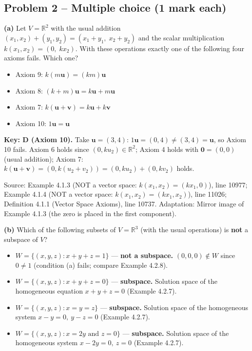 \documentclass[11pt,a4paper]{article}
\newcommand{\Src}[1]{{\footnotesize\color{black!65}Source: #1}}
\begin{document}
\subsection*{Problem 2 -- Multiple choice (1 mark each)}
\textbf{(a)} Let $V=\mathbb{R}^2$ with the usual addition $(x_1,x_2)+(y_1,y_2)=(x_1+y_1,\;x_2+y_2)$ and the scalar multiplication $k(x_1,x_2)=(0,\;kx_2)$. With these operations exactly one of the following four axioms fails. Which one?\par
\begin{itemize}[leftmargin=8mm,itemsep=0pt]\item[A] Axiom 9: $k(m\mathbf{u})=(km)\mathbf{u}$\item[B] Axiom 8: $(k+m)\mathbf{u}=k\mathbf{u}+m\mathbf{u}$\item[C] Axiom 7: $k(\mathbf{u}+\mathbf{v})=k\mathbf{u}+k\mathbf{v}$\item[D$^{\ast}$] Axiom 10: $1\mathbf{u}=\mathbf{u}$\end{itemize}
\textbf{Key: D (Axiom 10).} Take $\mathbf{u}=(3,4)$: $1\mathbf{u}=(0,4)\neq(3,4)=\mathbf{u}$, so Axiom 10 fails. Axiom 6 holds since $(0,ku_2)\in\mathbb{R}^2$; Axiom 4 holds with $\mathbf{0}=(0,0)$ (usual addition); Axiom 7: $k(\mathbf{u}+\mathbf{v})=(0,k(u_2+v_2))=(0,ku_2)+(0,kv_2)$ holds.\par
\Src{Example 4.1.3 (NOT a vector space: $k(x_1,x_2)=(kx_1,0)$), line 10977; Example 4.1.4 (NOT a vector space: $k(x_1,x_2)=(kx_1,x_2)$), line 11026; Definition 4.1.1 (Vector Space Axioms), line 10737. Adaptation: Mirror image of Example 4.1.3 (the zero is placed in the first component).}\par
{}\textbf{(b)} Which of the following subsets of $V=\mathbb{R}^3$ (with the usual operations) is \textbf{not} a subspace of $V$?\par
\begin{itemize}[leftmargin=8mm,itemsep=0pt]\item[A$^{\ast}$] $W=\{(x,y,z) : x+y+z=1\}$ --- \textbf{not a subspace.} $(0,0,0)\notin W$ since $0\neq1$ (condition (a) fails; compare Example 4.2.8).\item[B] $W=\{(x,y,z) : x+y+z=0\}$ --- \textbf{subspace.} Solution space of the homogeneous equation $x+y+z=0$ (Example 4.2.7).\item[C] $W=\{(x,y,z) : x=y=z\}$ --- \textbf{subspace.} Solution space of the homogeneous system $x-y=0,\ y-z=0$ (Example 4.2.7).\item[D] $W=\{(x,y,z) : x=2y \text{ and } z=0\}$ --- \textbf{subspace.} Solution space of the homogeneous system $x-2y=0,\ z=0$ (Example 4.2.7).\end{itemize}
\end{document}
